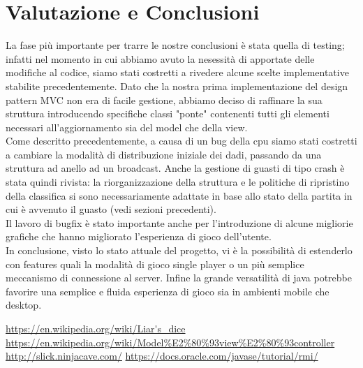 \documentclass{llncs}
\begin{document}
	\section{Valutazione e Conclusioni}%
		La fase più importante per trarre le nostre conclusioni è stata quella di testing; infatti nel momento in cui abbiamo avuto la nesessità di apportate delle modifiche al codice, siamo stati costretti a rivedere alcune scelte implementative stabilite precedentemente. Dato che la nostra prima implementazione del design pattern MVC non era di facile gestione, abbiamo deciso di raffinare la sua struttura introducendo specifiche classi "ponte" contenenti tutti gli elementi necessari all'aggiornamento sia del model che della view. \\
		Come descritto precedentemente, a causa di un bug della cpu siamo stati costretti a cambiare la modalità di distribuzione iniziale dei dadi, passando da una struttura ad anello ad un broadcast. Anche la gestione di guasti di tipo crash è stata quindi rivista: la riorganizzazione della struttura e le politiche di ripristino della classifica si sono necessariamente adattate in base allo stato della partita in cui è avvenuto il guasto (vedi sezioni precedenti). \\
		Il lavoro di bugfix è stato importante anche per l'introduzione di alcune migliorie grafiche che hanno migliorato l'esperienza di gioco dell'utente. \\
		In conclusione, visto lo stato attuale del progetto, vi è la possibilità di estenderlo con features quali la modalità di gioco single player o un più semplice meccanismo di connessione al server. Infine la grande versatilità di java potrebbe favorire una semplice e fluida esperienza di gioco sia in ambienti mobile che desktop.
	

	\begin{thebibliography}{}
		 \url{https://en.wikipedia.org/wiki/Liar's\_dice}
		 \url{https://en.wikipedia.org/wiki/Model%E2%80%93view%E2%80%93controller}
		 \url{http://slick.ninjacave.com/}
		 \url{https://docs.oracle.com/javase/tutorial/rmi/}
	\end{thebibliography}
\end{document}
